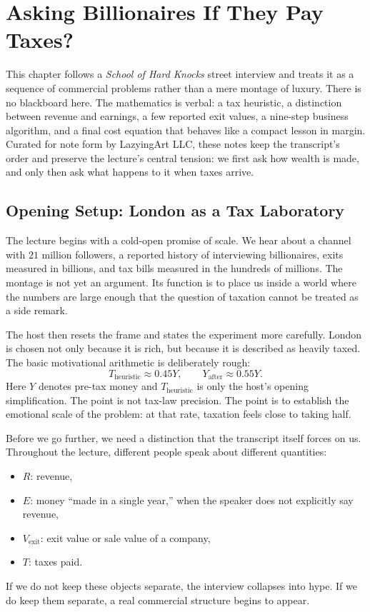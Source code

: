 \chapter{Asking Billionaires If They Pay Taxes?}

This chapter follows a \emph{School of Hard Knocks} street interview and treats it as a sequence of commercial problems rather than a mere montage of luxury. There is no blackboard here. The mathematics is verbal: a tax heuristic, a distinction between revenue and earnings, a few reported exit values, a nine-step business algorithm, and a final cost equation that behaves like a compact lesson in margin. Curated for note form by LazyingArt LLC, these notes keep the transcript's order and preserve the lecture's central tension: we first ask how wealth is made, and only then ask what happens to it when taxes arrive.

\section{Opening Setup: London as a Tax Laboratory}

The lecture begins with a cold-open promise of scale. We hear about a channel with \(21\) million followers, a reported history of interviewing billionaires, exits measured in billions, and tax bills measured in the hundreds of millions. The montage is not yet an argument. Its function is to place us inside a world where the numbers are large enough that the question of taxation cannot be treated as a side remark.

The host then resets the frame and states the experiment more carefully. London is chosen not only because it is rich, but because it is described as heavily taxed. The basic motivational arithmetic is deliberately rough:
\begin{equation}
T_{\mathrm{heuristic}} \approx 0.45Y,
\qquad
Y_{\mathrm{after}} \approx 0.55Y.
\end{equation}
Here \(Y\) denotes pre-tax money and \(T_{\mathrm{heuristic}}\) is only the host's opening simplification. The point is not tax-law precision. The point is to establish the emotional scale of the problem: at that rate, taxation feels close to taking half.

Before we go further, we need a distinction that the transcript itself forces on us. Throughout the lecture, different people speak about different quantities:
\begin{itemize}
\item \(R\): revenue,
\item \(E\): money ``made in a single year,'' when the speaker does not explicitly say revenue,
\item \(V_{\mathrm{exit}}\): exit value or sale value of a company,
\item \(T\): taxes paid.
\end{itemize}
If we do not keep these objects separate, the interview collapses into hype. If we do keep them separate, a real commercial structure begins to appear.

